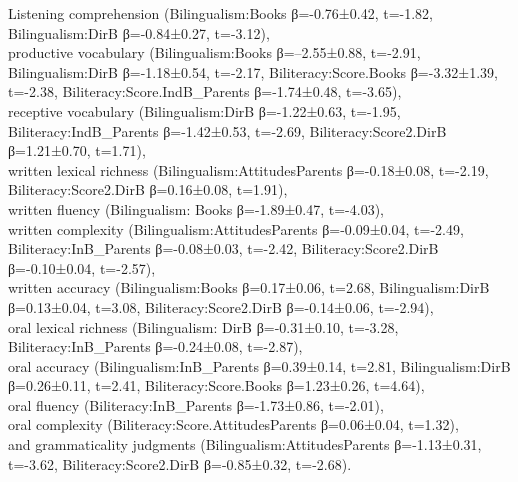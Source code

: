 \documentclass[output=paper,modfonts,nonflat,newtxmath]{langsci/langscibook}
\begin{document}
\begin{paperappendix}
Listening comprehension (Bilingualism:Books β=-0.76±0.42, t=-1.82, Bilingualism:DirB β=-0.84±0.27, t=-3.12),\\
 productive vocabulary (Bilingualism:Books β=--2.55±0.88, t=-2.91, Bilingualism:DirB β=-1.18±0.54, t=-2.17, Biliteracy:Score.Books β=-3.32±1.39, t=-2.38, Biliteracy:Score.IndB\_Parents β=-1.74±0.48, t=-3.65),\\
 receptive vocabulary (Bilingualism:DirB β=-1.22±0.63, t=-1.95, Biliteracy:IndB\_Parents β=-1.42±0.53, t=-2.69, Biliteracy:Score2.DirB β=1.21±0.70, t=1.71),\\
 written lexical richness (Bilingualism:AttitudesParents β=-0.18±0.08, t=-2.19, Biliteracy:Score2.DirB β=0.16±0.08, t=1.91),\\
 written fluency (Bilingualism: Books β=-1.89±0.47, t=-4.03),\\
 written complexity (Bilingualism:AttitudesParents β=-0.09±0.04, t=-2.49, Biliteracy:InB\_Parents β=-0.08±0.03, t=-2.42, Biliteracy:Score2.DirB β=-0.10±0.04, t=-2.57),\\
 written accuracy (Bilingualism:Books β=0.17±0.06, t=2.68, Bilingualism:DirB β=0.13±0.04, t=3.08, Biliteracy:Score2.DirB β=-0.14±0.06, t=-2.94),\\
 oral lexical richness (Bilingualism: DirB β=-0.31±0.10, t=-3.28, Biliteracy:InB\_Parents β=-0.24±0.08, t=-2.87),\\
 oral accuracy (Bilingualism:InB\_Parents β=0.39±0.14, t=2.81, Bilingualism:DirB β=0.26±0.11, t=2.41, Biliteracy:Score.Books β=1.23±0.26, t=4.64),\\
 oral fluency (Biliteracy:InB\_Parents β=-1.73±0.86, t=-2.01),\\
 oral complexity (Biliteracy:Score.AttitudesParents β=0.06±0.04, t=1.32),\\
 and grammaticality judgments (Bilingualism:AttitudesParents β=-1.13±0.31, t=-3.62, Biliteracy:Score2.DirB β=-0.85±0.32, t=-2.68).
\end{paperappendix}
\end{document}
